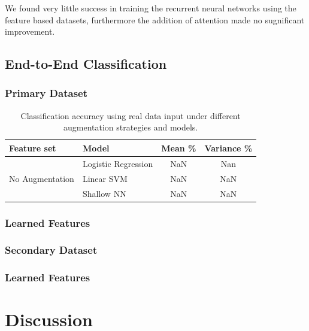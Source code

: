 \documentclass[utf8]{frontiersSCNS} %
\begin{document}
We found very little success in training the recurrent neural networks using the feature based datasets, furthermore the addition of attention made no sugnificant improvement.


\subsection{End-to-End Classification}

\subsubsection{Primary Dataset}

\begin{table}[t]
  \centering
  \label{tab:end2end_results}
  \begin{tabular}{l l | c | c}
    \textbf{Feature set} & Model & \textbf{Mean \%} & \textbf{Variance \%} \\
    \toprule
    \multirow{3}{*}{No Augmentation}
    & Logistic Regression & NaN & Nan  \\
    & Linear SVM          & NaN & NaN  \\
    & Shallow NN          & NaN & NaN  \\
    \midrule

    \bottomrule
  \end{tabular}
  \caption{Classification accuracy using real data input under different augmentation strategies and models.}
\end{table}

\subsubsection{Learned Features}

\subsubsection{Secondary Dataset}

\subsubsection{Learned Features}

\section{Discussion}
\end{document}
